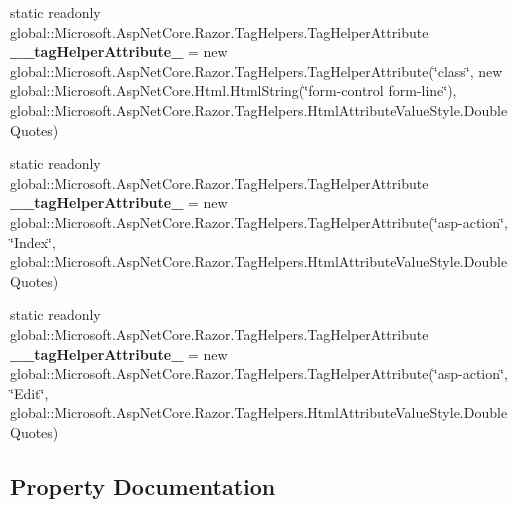 \begin{DoxyCompactItemize}
static readonly global\+::\+Microsoft.\+Asp\+Net\+Core.\+Razor.\+Tag\+Helpers.\+Tag\+Helper\+Attribute {\bfseries \+\_\+\+\_\+tag\+Helper\+Attribute\+\_} = new global\+::\+Microsoft.\+Asp\+Net\+Core.\+Razor.\+Tag\+Helpers.\+Tag\+Helper\+Attribute(\char`\"{}class\char`\"{}, new global\+::\+Microsoft.\+Asp\+Net\+Core.\+Html.\+Html\+String(\char`\"{}form-\/control form-\/line\char`\"{}), global\+::\+Microsoft.\+Asp\+Net\+Core.\+Razor.\+Tag\+Helpers.\+Html\+Attribute\+Value\+Style.\+Double\+Quotes)
\item 
\mbox{\label{class_asp_net_core_1_1_views___volunteers___edit_a27d4f85021f62ba9d5934eca42872c43}} 
static readonly global\+::\+Microsoft.\+Asp\+Net\+Core.\+Razor.\+Tag\+Helpers.\+Tag\+Helper\+Attribute {\bfseries \+\_\+\+\_\+tag\+Helper\+Attribute\+\_} = new global\+::\+Microsoft.\+Asp\+Net\+Core.\+Razor.\+Tag\+Helpers.\+Tag\+Helper\+Attribute(\char`\"{}asp-\/action\char`\"{}, \char`\"{}Index\char`\"{}, global\+::\+Microsoft.\+Asp\+Net\+Core.\+Razor.\+Tag\+Helpers.\+Html\+Attribute\+Value\+Style.\+Double\+Quotes)
\item 
\mbox{\label{class_asp_net_core_1_1_views___volunteers___edit_a580ac9458b43e6e64ab4d62e37c448b0}} 
static readonly global\+::\+Microsoft.\+Asp\+Net\+Core.\+Razor.\+Tag\+Helpers.\+Tag\+Helper\+Attribute {\bfseries \+\_\+\+\_\+tag\+Helper\+Attribute\+\_} = new global\+::\+Microsoft.\+Asp\+Net\+Core.\+Razor.\+Tag\+Helpers.\+Tag\+Helper\+Attribute(\char`\"{}asp-\/action\char`\"{}, \char`\"{}Edit\char`\"{}, global\+::\+Microsoft.\+Asp\+Net\+Core.\+Razor.\+Tag\+Helpers.\+Html\+Attribute\+Value\+Style.\+Double\+Quotes)
\end{DoxyCompactItemize}


\subsection{Property Documentation}
\mbox{\label{class_asp_net_core_1_1_views___volunteers___edit_a5ad8252aa5240e12445b356f0d9155df}} 
